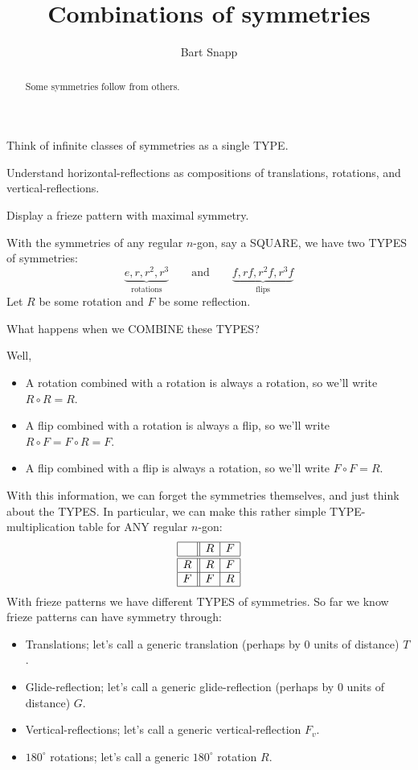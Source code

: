 \documentclass[noauthor,nooutcomes,hints,handout]{ximera}
\author{Bart Snapp}
\title{Combinations of symmetries}
\begin{document}
\begin{abstract}
  Some symmetries follow from others. 
\end{abstract}
\maketitle

\begin{listOutcomes}
\item Think of infinite classes of symmetries as a single TYPE.
\item Understand horizontal-reflections as compositions of
  translations, rotations, and vertical-reflections.
\item Display a frieze pattern with maximal symmetry.
\end{listOutcomes}


With the symmetries of any regular $n$-gon, say a SQUARE, we have two TYPES of symmetries:
\[
\underbrace{e,r,r^2,r^3}_{\text{rotations}} \qquad\text{and}\qquad \underbrace{f, rf,r^2f,r^3f}_{\text{flips}}
\]
Let $R$ be some rotation and $F$ be some reflection.
\begin{center}
  What happens when we COMBINE these TYPES?
\end{center}
Well,
\begin{itemize}
\item A rotation combined with a rotation is always a rotation, so we'll write $R \circ R = R$.
\item A flip combined with a rotation is always a flip, so we'll write
  $R\circ F = F \circ R = F$.
\item A flip combined with a flip is always a rotation, so we'll
  write $F\circ F = R$.
\end{itemize}
With this information, we can forget the symmetries themselves, and
just think about the TYPES. In particular, we can make this rather
simple TYPE-multiplication table for ANY regular $n$-gon:
\[
\begin{array}{|c||c|c|}
    \hline
       & R    & F    \\ \hline\hline
    R  & R    & F    \\ \hline
    F  & F    & R    \\ \hline
\end{array}
\]
With frieze patterns we have different TYPES of symmetries. So far we
know frieze patterns can have symmetry through:
\begin{itemize}
\item Translations; let's call a generic translation (perhaps by $0$ units of distance) $T$.
\item Glide-reflection; let's call a generic glide-reflection (perhaps by $0$ units of distance) $G$.
\item Vertical-reflections; let's call a generic vertical-reflection $F_v$.
\item $180^\circ$ rotations; let's call a generic $180^\circ$
  rotation $R$.
\end{itemize}
\end{document}
